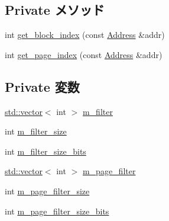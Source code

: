 \subsection*{Private メソッド}
\begin{DoxyCompactItemize}
\item 
int \hyperlink{classMultiGrainBloomFilter_ab51932d43eaff65d567ef66e7cb780a7}{get\_\-block\_\-index} (const \hyperlink{classAddress}{Address} \&addr)
\item 
int \hyperlink{classMultiGrainBloomFilter_afe2bb7b363c084edcbfec4a359a3dd12}{get\_\-page\_\-index} (const \hyperlink{classAddress}{Address} \&addr)
\end{DoxyCompactItemize}
\subsection*{Private 変数}
\begin{DoxyCompactItemize}
\item 
\hyperlink{classstd_1_1vector}{std::vector}$<$ int $>$ \hyperlink{classMultiGrainBloomFilter_aae3fd71ce4b5e8910aa63829ba6abd41}{m\_\-filter}
\item 
int \hyperlink{classMultiGrainBloomFilter_af53abddc4707ab403450239a6e94c486}{m\_\-filter\_\-size}
\item 
int \hyperlink{classMultiGrainBloomFilter_a5c26703945ae76ff80ec6951cccea29c}{m\_\-filter\_\-size\_\-bits}
\item 
\hyperlink{classstd_1_1vector}{std::vector}$<$ int $>$ \hyperlink{classMultiGrainBloomFilter_af24ebfd2b75ebdffb40e0e3ae260ee40}{m\_\-page\_\-filter}
\item 
int \hyperlink{classMultiGrainBloomFilter_a23281ab3f7baa7257b28dbedca244175}{m\_\-page\_\-filter\_\-size}
\item 
int \hyperlink{classMultiGrainBloomFilter_a7c26b6fdd672a93ea47cbd6b9be58f24}{m\_\-page\_\-filter\_\-size\_\-bits}
\end{DoxyCompactItemize}


